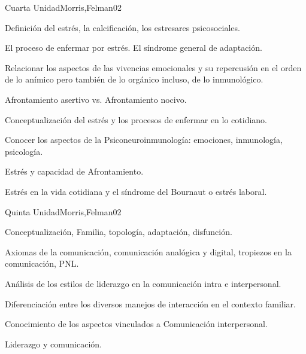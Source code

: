 \begin{syllabus}
\begin{unit}{Cuarta Unidad}{Morris,Felman}{0}{2}
\begin{topics}
	\item Definición del estrés, la calcificación, los estresares psicosociales.
	\item El proceso de enfermar por estrés. El síndrome general de adaptación.
	\item Relacionar los aspectos de las vivencias emocionales y su repercusión en el orden de lo anímico pero también de lo orgánico incluso, de lo inmunológico.
	\item Afrontamiento asertivo vs. Afrontamiento nocivo.
\end{topics}
\begin{learningoutcomes}
	\item Conceptualización del estrés y los procesos de enfermar en lo cotidiano.
	\item Conocer los aspectos de la Psiconeuroinmunología: emociones, inmunología, psicología.
	\item Estrés y capacidad de Afrontamiento.
	\item Estrés en la vida cotidiana y el síndrome del Bournaut o estrés laboral.
\end{learningoutcomes}
\end{unit}

\begin{unit}{Quinta Unidad}{Morris,Felman}{0}{2}
\begin{topics}
	\item Conceptualización, Familia, topología, adaptación, disfunción.
	\item Axiomas de la comunicación, comunicación analógica y digital, tropiezos en la comunicación, PNL.
	\item Análisis de los estilos de liderazgo en la comunicación intra e interpersonal.
\end{topics}
\begin{learningoutcomes}
	\item Diferenciación entre los diversos manejos de interacción en el contexto familiar.
	\item Conocimiento de los aspectos vinculados a Comunicación interpersonal.
	\item Liderazgo y comunicación.
\end{learningoutcomes}
\end{unit}


\end{syllabus}
